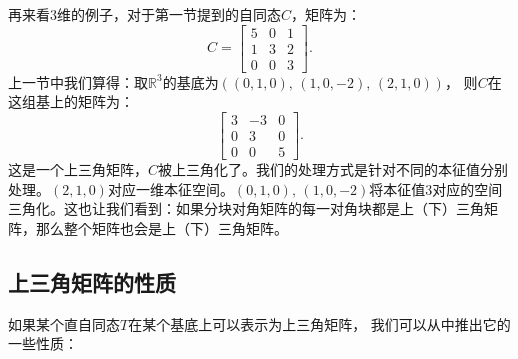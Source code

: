 \documentclass[12pt,UTF8,fontset=none]{ctexbook}
\begin{document}
再来看$3$维的例子，对于第一节提到的自同态$C$，矩阵为：
$$
C = \begin{bmatrix} 5 & 0 & 1 \\ 1 & 3 & 2 \\ 0 & 0 & 3 \end{bmatrix}.
$$
上一节中我们算得：取$\mathbb{R}^3$的基底为$((0,1,0),\, (1,0,-2),\, (2,1,0))$，
则$C$在这组基上的矩阵为：
$$
\begin{bmatrix} 3 & -3 & 0 \\ 0 & 3 & 0 \\ 0 & 0 & 5 \end{bmatrix}.
$$
这是一个上三角矩阵，$C$被上三角化了。我们的处理方式是针对不同的本征值分别处理。$(2,1,0)$对应一维本征空间。$(0,1,0),\, (1,0,-2)$将本征值$3$对应的空间三角化。这也让我们看到：如果分块对角矩阵的每一对角块都是上（下）三角矩阵，那么整个矩阵也会是上（下）三角矩阵。

\subsection{上三角矩阵的性质}
如果某个直自同态$T$在某个基底上可以表示为上三角矩阵，
我们可以从中推出它的一些性质：
\end{document}
